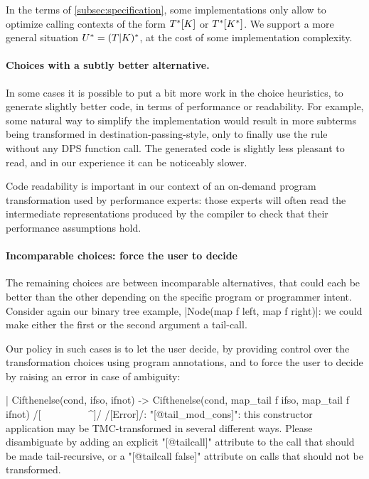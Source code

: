 In the terms of \cref{subsec:specification}, some implementations only allow to optimize calling contexts of the form $\datalangTailCtx{[\datalangConsFrame]}$ or $\datalangTailCtx{[\datalangConsCtx]}$. We support a more general situation $\datalangTMCCtx = (\datalangTailFrame | \datalangConsFrame)^{*}$, at the cost of some implementation complexity.

\paragraph{Choices with a subtly better alternative.} In some cases it
is possible to put a bit more work in the choice heuristics, to
generate slightly better code, in terms of performance or
readability. For example, some natural way to simplify the
implementation would result in more subterms being transformed in
destination-passing-style, only to finally use the
 rule without any DPS function call. The generated
code is slightly less pleasant to read, and in our experience it can
be noticeably slower.

Code readability is important in our context of an on-demand program
transformation used by performance experts: those experts will often
read the intermediate representations produced by the compiler to
check that their performance assumptions hold.

\paragraph{Incomparable choices: force the user to decide} The
remaining choices are between incomparable alternatives, that could
each be better than the other depending on the specific program or
programmer intent. Consider again our binary tree example,
\ocaml|Node(map f left, map f right)|: we could make either the first
or the second argument a tail-call.

Our policy in such cases is to let the user decide, by providing
control over the transformation choices using \ocaml{[@tailcall]}
program annotations, and to force the user to decide by raising an
error in case of ambiguity:
\begin{Ocaml}
  | Cifthenelse(cond, ifso, ifnot) ->
      Cifthenelse(cond, map_tail f ifso, map_tail f ifnot)
      /[^^^^^^^^^^^^^^^^^^^^^^^^^^^^^^^^^^^^^^^^^^^^^^^^^^^^]/
/[Error]/: "[@tail_mod_cons]": this constructor application may be TMC-transformed
       in several different ways. Please disambiguate by adding an explicit
       "[@tailcall]" attribute to the call that should be made tail-recursive,
       or a "[@tailcall false]" attribute on calls that should not be
       transformed.
\end{Ocaml}

